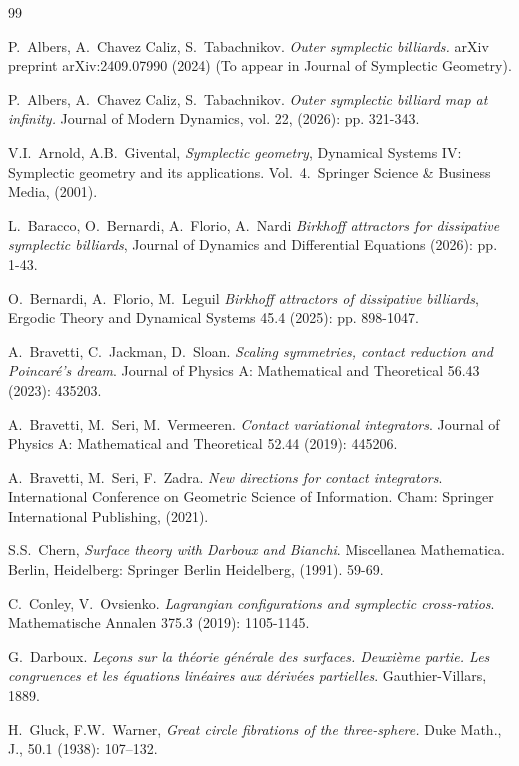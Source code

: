 \documentclass{article}
\begin{document}
\begin{thebibliography}{99}


 P.~Albers, A.~Chavez Caliz, S.~Tabachnikov. {\em Outer symplectic billiards.} arXiv preprint  arXiv:2409.07990 (2024) (To appear in Journal of Symplectic Geometry).

 P.~Albers, A.~Chavez Caliz, S.~Tabachnikov. {\em Outer symplectic billiard map at infinity.} Journal of Modern Dynamics, vol. 22, (2026): pp. 321-343.

 V.I.~Arnold, A.B.~Givental, {\em Symplectic geometry}, Dynamical Systems IV: Symplectic geometry and its applications.
Vol.~4.~Springer Science \& Business Media, (2001).

 L.~Baracco, O.~Bernardi, A.~Florio, A.~Nardi {\em Birkhoff attractors for dissipative symplectic billiards}, Journal of Dynamics and Differential Equations (2026): pp. 1-43.

 O.~Bernardi, A.~Florio, M.~Leguil {\em Birkhoff attractors of dissipative billiards}, Ergodic Theory and Dynamical Systems 45.4 (2025): pp. 898-1047.

 A.~Bravetti, C.~Jackman, D.~Sloan. {\em Scaling symmetries, contact reduction and Poincar\'e’s dream}. Journal of Physics A: Mathematical and Theoretical 56.43 (2023): 435203.

 A.~Bravetti, M.~Seri, M.~Vermeeren. {\em Contact variational integrators}. Journal of Physics A: Mathematical and Theoretical 52.44 (2019): 445206.

 A.~Bravetti, M.~Seri, F.~Zadra. {\em New directions for contact integrators}. International Conference on Geometric Science of Information. Cham: Springer International Publishing, (2021).

 S.S.~Chern, {\em Surface theory with Darboux and Bianchi}. Miscellanea Mathematica. Berlin, Heidelberg: Springer Berlin Heidelberg, (1991). 59-69.

 C.~Conley, V.~Ovsienko. {\em Lagrangian configurations and symplectic cross-ratios}. Mathematische Annalen 375.3 (2019): 1105-1145.

 G.~Darboux. {\em Le\c cons sur la th\'eorie g\'en\'erale des surfaces. Deuxi\`eme partie. Les congruences et les \'equations lin\'eaires aux d\'eriv\'ees partielles}. Gauthier-Villars, 1889.

 H.~Gluck, F.W.~Warner, {\em Great circle fibrations of the three-sphere.} Duke Math., J., 50.1 (1938): 107--132.


\end{thebibliography}
\end{document}
